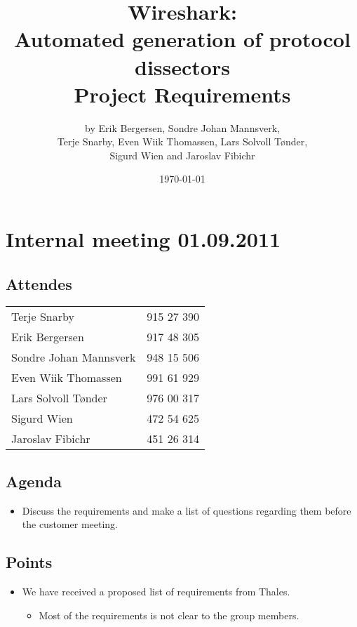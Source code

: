 \documentclass[a4paper, 11pt]{report}
\title{Wireshark:\\ Automated generation of protocol dissectors\\
		Project Requirements}
\author{by Erik Bergersen, Sondre Johan Mannsverk,\\ Terje Snarby,
		Even Wiik Thomassen, Lars Solvoll Tønder,\\ Sigurd Wien
		and Jaroslav Fibichr}
\date{\today}
\begin{document}
\section*{Internal meeting 01.09.2011}

\subsection*{Attendes}

\begin{tabular}{ l  l}
Terje Snarby & 915 27 390 \\
Erik Bergersen & 917 48 305 \\
Sondre Johan Mannsverk & 948 15 506 \\
Even Wiik Thomassen & 991 61 929 \\
Lars Solvoll Tønder & 976 00 317 \\
Sigurd Wien & 472 54 625 \\
Jaroslav Fibichr & 451 26 314 \\

\end{tabular}

\subsection*{Agenda}

\begin{itemize}
\item Discuss the requirements and make a list of questions regarding them before the customer meeting. 
\end{itemize}

\subsection*{Points}

\begin{itemize}
\item We have received a proposed list of requirements from Thales.
	\begin{itemize}
	\item Most of the requirements is not clear to the group members.
	\end{itemize}
\end{itemize}
\end{document}
